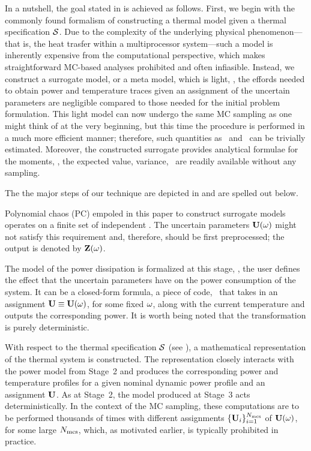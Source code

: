 
In a nutshell, the goal stated in  is achieved as follows. First, we begin with the commonly found formalism of constructing a thermal model given a thermal specification $\mathcal{S}$. Due to the complexity of the underlying physical phenomenon---that is, the heat trasfer within a multiprocessor system---such a model is inherently expensive from the computational perspective, which makes straightforward MC-based analyses prohibited and often infiasible. Instead, we construct a surrogate model, or a meta model, which is light, \ie, the effords needed to obtain power and temperature traces given an assignment of the uncertain parameters are negligible compared to those needed for the initial problem formulation. This light model can now undergo the same MC sampling as one might think of at the very beginning, but this time the procedure is performed in a much more efficient manner; therefore, such quantities as \cdfs\ and \pdfs\ can be trivially estimated. Moreover, the constructed surrogate provides analytical formulae for the moments, \ie, the expected value, variance, \etc\ are readily available without any sampling.

The the major steps of our technique are depicted in  and are spelled out below.

 Polynomial chaos (PC) empoled in this paper to construct surrogate models operates on a finite set of independent \rvs. The uncertain parameters $\mathbf{U}(\omega)$ might not satisfy this requirement and, therefore, should be first preprocessed; the output is denoted by $\mathbf{Z}(\omega)$.

 The model of the power dissipation is formalized at this stage, \ie, the user defines the effect that the uncertain parameters have on the power consumption of the system. It can be a closed-form formula, a piece of code, \etc\ that takes in an assignment $\mathbf{U} \equiv \mathbf{U}(\omega)$, for some fixed $\omega$, along with the current temperature and outputs the corresponding power. It is worth being noted that the transformation is purely deterministic.

 With respect to the thermal specification $\mathcal{S}$ (see ), a mathematical representation of the thermal system is constructed. The representation closely interacts with the power model from Stage~2 and produces the corresponding power and temperature profiles for a given nominal dynamic power profile and an assignment $\mathbf{U}$. As at Stage~2, the model produced at Stage~3 acts deterministically. In the context of the MC sampling, these computations are to be performed thousands of times with different assignments $\{ \mathbf{U}_i \}_{i = 1}^{N_\text{mcs}}$ of $\mathbf{U}(\omega)$, for some large $N_\text{mcs}$, which, as motivated earlier, is typically prohibited in practice.

